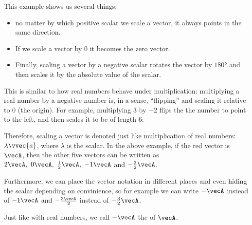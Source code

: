 \begin{descitemize}
	This example shows us several things:
	\begin{itemize}
		\item no matter by which positive scalar we scale a vector, it always points in the same direction.
		\item If we scale a vector by $0$ it becomes the zero vector.
		\item Finally, scaling a vector by a negative scalar rotates the vector by $\ang{180}$ and then scales it by the absolute value of the scalar.
	\end{itemize}

	This is similar to how real numbers behave under multiplication: multiplying a real number by a negative number is, in a sense, \enquote{flipping} and scaling it relative to $0$ (the origin). For example, multiplying $3$ by $-2$ flips the the number to point to the left, and then scales it to be of length $6$:

	\begin{center}
	\end{center}

	Therefore, scaling a vector is denoted just like multiplication of real numbers: $\lambda\vvec{a}$, where $\lambda$ is the scalar. In the above example, if the red vector is $\vecA$, then the other five vectors can be written as $2\vecA,\ 0\vecA,\ \frac{1}{2}\vecA,\ -1\vecA$ and $-\frac{3}{2}\vecA$.

	Furthermore, we can place the vector notation in different places and even hiding the scalar depending on convinience, so for example we can write $-\vecA$ instead of $-1\vecA$ and $-\frac{3\vecA}{2}$ instead of $-\frac{3}{2}\vecA$.

	Just like with real numbers, we call $-\vecA$ the  of $\vecA$.
\end{descitemize}

